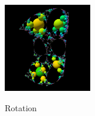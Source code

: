 \begin{figure}[h!tbp]
\begin{minipage}[]{0.49\hsize}
\begin{minipage}[]{0.24\hsize}
   \label{fig:rotationGen}
  \end{minipage}
  \hspace*{\fill}
  \begin{minipage}[]{0.24\hsize}
   \center
   \includegraphics[width=1.5in, height=1.5in, keepaspectratio]{../img/klein/3diis/rotationOrb.pdf}
   \label{fig:rotationOrb}
  \end{minipage}
  \hspace*{\fill}
  \caption{Rotation}
  \label{fig:rotation3d}
 \end{minipage}
\end{figure}

